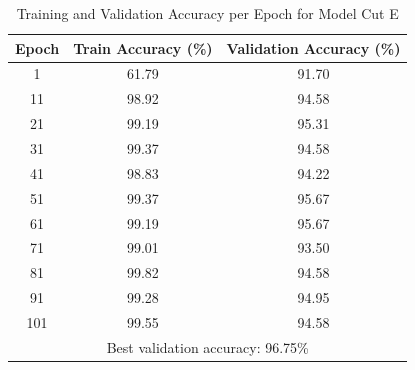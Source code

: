 \documentclass[11pt]{scrartcl}
\begin{document}
\begin{table}[htbp]
\centering
\caption{Training and Validation Accuracy per Epoch for Model Cut E}
\begin{tabular}{ccc}
\toprule
\textbf{Epoch} & \textbf{Train Accuracy (\%)} & \textbf{Validation Accuracy (\%)} \\
\midrule
1    & 61.79 & 91.70 \\
11   & 98.92 & 94.58 \\
21   & 99.19 & 95.31 \\
31   & 99.37 & 94.58 \\
41   & 98.83 & 94.22 \\
51   & 99.37 & 95.67 \\
61   & 99.19 & 95.67 \\
71   & 99.01 & 93.50 \\
81   & 99.82 & 94.58 \\
91   & 99.28 & 94.95 \\
101  & 99.55 & 94.58 \\
\midrule
\multicolumn{3}{c}{Best validation accuracy: 96.75\%} \\
\bottomrule
\end{tabular}
\label{tab:task3-model-cute-accuracy}
\end{table}
\end{document}
